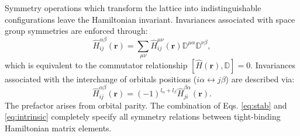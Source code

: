 \documentclass[twocolumn,showpacs,preprintnumbers,superscriptaddress,prb,floatfix,aps,10pt]{revtex4-1}
\renewcommand{\vec}[1]{\ensuremath{\mathbf{#1}}}
\newcommand*{\ham}{\hat{H}}
\newcommand*{\wignerD}{\mathbb{D}}%
\begin{document}
Symmetry operations which transform the lattice into indistinguishable configurations leave the Hamiltonian invariant. Invariances associated with space group symmetries are enforced through:
\begin{equation}
\label{eq:stab}
\ham^{\alpha\beta}_{ij}(\vec{r}) = \sum_{\mu\nu} \ham^{\mu\nu}_{ij}(\vec{r}) \mathbb{D}^{\mu\alpha} \mathbb{D}^{\nu\beta},
\end{equation}
which is equivalent to the commutator relationship $[\ham(\vec{r}),\wignerD] = 0$. Invariances associated with the interchange of orbitals positions ($i\alpha \leftrightarrow j\beta$) are described via:
%
\begin{equation}
\label{eq:intrinsic}
\ham^{\alpha\beta}_{ij}(\vec{r}) = (-1)^{l_\alpha+l_\beta} \ham^{\beta\alpha}_{ji}(\vec{r}).
\end{equation}
%
The prefactor arises from orbital parity. The combination of Eqs. \ref{eq:stab} and \ref{eq:intrinsic} completely specify all symmetry relations between tight-binding Hamiltonian matrix elements.

\end{document}
